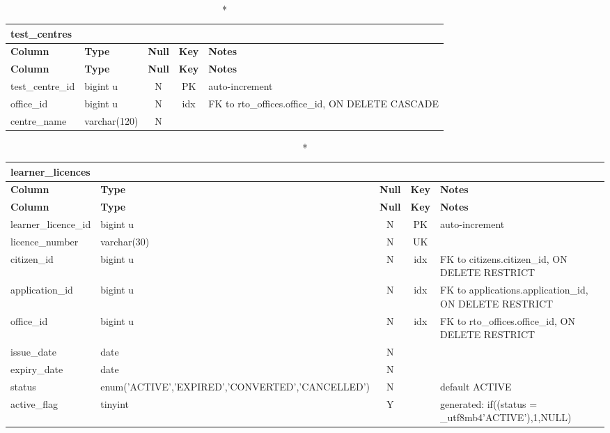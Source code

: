 \begin{longtable}{@{}p{3.4cm}p{2.9cm}c c p{5.6cm}@{}}
\caption*{\textbf{test\_\allowbreak{}centres}}\\
\toprule \textbf{Column} & \textbf{Type} & \textbf{Null} & \textbf{Key} & \textbf{Notes} \\ \midrule \endfirsthead
\toprule \textbf{Column} & \textbf{Type} & \textbf{Null} & \textbf{Key} & \textbf{Notes} \\ \midrule \endhead
\bottomrule \endlastfoot
test\_\allowbreak{}centre\_\allowbreak{}id & bigint u & N & PK & auto-increment \\
office\_\allowbreak{}id & bigint u & N & idx & FK to rto\_\allowbreak{}offices.office\_\allowbreak{}id, ON DELETE CASCADE \\
centre\_\allowbreak{}name & varchar(120) & N &  &  \\
\end{longtable}
\vspace{-0.4em}
\begin{longtable}{@{}p{3.4cm}p{2.9cm}c c p{5.6cm}@{}}
\caption*{\textbf{learner\_\allowbreak{}licences}}\\
\toprule \textbf{Column} & \textbf{Type} & \textbf{Null} & \textbf{Key} & \textbf{Notes} \\ \midrule \endfirsthead
\toprule \textbf{Column} & \textbf{Type} & \textbf{Null} & \textbf{Key} & \textbf{Notes} \\ \midrule \endhead
\bottomrule \endlastfoot
learner\_\allowbreak{}licence\_\allowbreak{}id & bigint u & N & PK & auto-increment \\
licence\_\allowbreak{}number & varchar(30) & N & UK &  \\
citizen\_\allowbreak{}id & bigint u & N & idx & FK to citizens.citizen\_\allowbreak{}id, ON DELETE RESTRICT \\
application\_\allowbreak{}id & bigint u & N & idx & FK to applications.application\_\allowbreak{}id, ON DELETE RESTRICT \\
office\_\allowbreak{}id & bigint u & N & idx & FK to rto\_\allowbreak{}offices.office\_\allowbreak{}id, ON DELETE RESTRICT \\
issue\_\allowbreak{}date & date & N &  &  \\
expiry\_\allowbreak{}date & date & N &  &  \\
status & enum('ACTIVE',\allowbreak{}'EXPIRED',\allowbreak{}'CONVERTED',\allowbreak{}'CANCELLED') & N &  & default ACTIVE \\
active\_\allowbreak{}flag & tinyint & Y &  & generated: if((status = \_\allowbreak{}utf8mb4'ACTIVE'),1,NULL) \\
\end{longtable}
